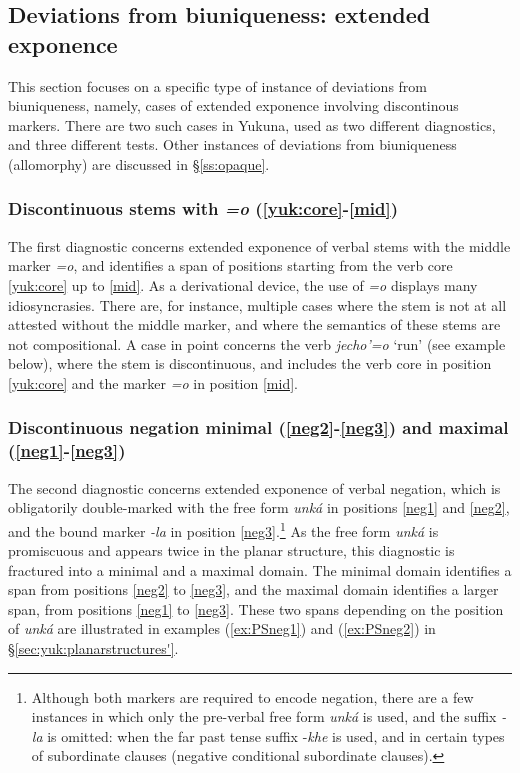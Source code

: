 \documentclass[output=paper]{langscibook}
\begin{document}
\subsection{Deviations from biuniqueness: extended exponence}

This section focuses on a specific type of instance of deviations from biuniqueness, namely, cases of extended exponence involving discontinous markers. There are two such cases in Yukuna, used as two different diagnostics, and three different tests. Other instances of deviations from biuniqueness (allomorphy) are discussed in §\ref{ss:opaque}.

\subsubsection{Discontinuous stems with \textit{=o} (\ref{yuk:core}-\ref{mid})}
The first diagnostic concerns extended exponence of verbal stems with the middle marker \textit{=o}, and identifies a span of positions starting from the verb core \ref{yuk:core} up to \ref{mid}. As a derivational device, the use of \textit{=o} displays many idiosyncrasies. There are, for instance, multiple cases where the stem is not at all attested without the middle marker, and where the semantics of these stems are not compositional. A case in point concerns the verb \textit{jecho'=o} `run' (see example  below), where the stem is discontinuous, and includes the verb core in position \ref{yuk:core} and the marker \textit{=o} in position \ref{mid}.

\subsubsection{Discontinuous negation minimal (\ref{neg2}-\ref{neg3}) and maximal (\ref{neg1}-\ref{neg3})}
The second diagnostic concerns extended exponence of verbal negation, which is obligatorily double-marked with the free form \textit{unká} in positions \ref{neg1} and \ref{neg2}, and the bound marker \textit{-la} in position \ref{neg3}.\footnote{Although both markers are required to encode negation, there are a few instances in which only the pre-verbal free form \textit{unká} is used, and the suffix \textit{-la} is omitted: when the far past tense suffix -\textit{khe} is used, and in certain types of subordinate clauses (negative conditional subordinate clauses).} As the free form \textit{unká} is promiscuous and appears twice in the planar structure, this diagnostic is fractured into a minimal and a maximal domain. The minimal domain identifies a span from positions \ref{neg2} to \ref{neg3}, and the maximal domain identifies a larger span, from positions \ref{neg1} to \ref{neg3}. These two spans depending on the position of \textit{unká} are illustrated in examples (\ref{ex:PSneg1}) and (\ref{ex:PSneg2}) in §\ref{sec:yuk:planarstructures'}.
\end{document}
